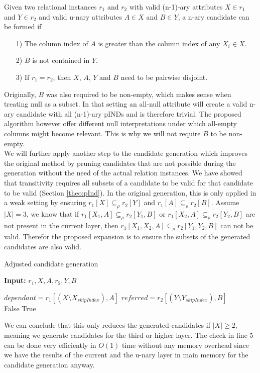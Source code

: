 \noindent Given two relational instances $r_1$ and $r_2$ with valid (n-1)-ary attributes $X \in r_1$ and $Y \in r_2$ and valid u-nary attributes $A \in X$ and $B \in Y$, a n-ary candidate can be formed if
\begin{itemize}
    \item[1)] The column index of $A$ is greater than the column index of any $X_i \in X$.
    \item[2)] $B$ is not contained in $Y$.
    \item[3)] If $r_1 = r_2$, then $X$, $A$, $Y$ and $B$ need to be pairwise disjoint.
\end{itemize}
Originally, $B$ was also required to be non-empty, which makes sense when treating null as a subset. In that setting an all-null attribute will create a valid n-ary candidate with all (n-1)-ary pINDs and is therefore trivial. The proposed algorithm however offer different null interpretations under which all-empty columns might become relevant. This is why we will not require $B$ to be non-empty. \\

\noindent We will further apply another step to the candidate generation which improves the original method by pruning candidates that are not possible during the generation without the need of the actual relation instances. We have showed that transitivity requires all subsets of a candidate to be valid for that candidate to be valid (Section \ref{theo:pInd}). In the original generation, this is only applied in a weak setting by ensuring $r_1[X] \subseteq_\rho r_2[Y]$ and $r_1[A] \subseteq_\rho r_2[B]$. Assume $|X| = 3$, we know that if $r_1[X_1, A] \subseteq_\rho r_2[Y_1, B]$ or $r_1[X_2, A] \subseteq_\rho r_2[Y_2, B]$ are not present in the current layer, then $r_1[X_1, X_2, A] \subseteq_\rho r_2[Y_1, Y_2, B]$ can not be valid. Therefor the proposed expansion is to ensure the subsets of the generated candidates are also valid.
\begin{algorithm}
    \caption{Adjusted candidate generation}\label{alg:canditate_gen}
    \hspace*{\algorithmicindent} \textbf{Input:} $r_1, X, A, r_2, Y, B$
    \begin{algorithmic}[1]
        \State $dependant = r_1[(X \setminus X_{skipIndex}), A]$
        \State $referred = r_2[(Y \setminus Y_{skipIndex}), B]$ \\
            \State \Return False
        \EndIf
    \EndFor
    \State \Return True
    \end{algorithmic}
\end{algorithm}

\noindent We can conclude that this only reduces the generated candidates if $|X| \geq 2$, meaning we generate candidates for the third or higher layer. The check in line 5 can be done very efficiently in $O(1)$ time without any memory overhead since we have the results of the current and the u-nary layer in main memory for the candidate generation anyway.